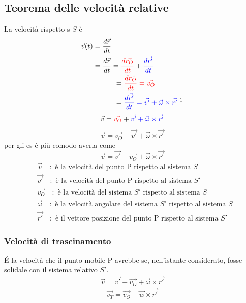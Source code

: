 \documentclass[twoside]{article}
\begin{document}
\subsection{Teorema delle velocità relative}
La velocità rispetto s $S$ è
\begin{align*}
  \vec{v}(t) & =  \frac{d \vec{r}}{dt}                                                                                                        \\
             & =  \frac{d \vec{r}}{dt} = \textcolor{red}{\frac{d \vec{r_O}}{dt}} + \textcolor{blue}{\frac{d \vec{r'}}{dt}}                    \\
             & \quad \quad \quad = \textcolor{red}{\frac{d \vec{r_O}}{dt} = \vec{v_O}}                                                        \\
             & \quad \quad \quad = \textcolor{blue}{\frac{d \vec{r'}}{dt} = \vec{v'} + \vec{\omega} \times \vec{r'}}\ \text{\footnotemark[1]}
\end{align*}
\begin{equation*}
  \vec{v} =  \textcolor{red}{\vec{v_O}} + \textcolor{blue}{\vec{v'} + \vec{\omega} \times \vec{r'}}
\end{equation*}
\begin{equation}
  \boxed{\vec{v} =  \vec{v_O} + \vec{v'} + \vec{\omega} \times \vec{r'}}
\end{equation}
per gli es è più comodo averla come
\begin{equation}
  \boxed{\vec{v} = \vec{v'} + \vec{v_O} + \vec{\omega} \times \vec{r'}}
\end{equation}
\begin{align*}
   & \vec{v}      \quad : \text{ è la velocità del punto P rispetto al sistema } S                      \\
   & \vec{v'}     \quad : \text{ è la velocità del punto P rispetto al sistema } S'                     \\
   & \vec{v_O}    \quad : \text{ è la velocità del sistema } S' \text{ rispetto al sistema } S          \\
   & \vec{\omega} \quad : \text{ è la velocità angolare del sistema } S' \text{ rispetto al sistema } S \\
   & \vec{r'}     \quad : \text{ è il vettore posizione del punto P rispetto al sistema } S'
\end{align*}
\subsubsection{Velocità di trascinamento}
\'E la velocità che il punto mobile P avrebbe se, nell'istante considerato, fosse solidale con il sistema relativo $S'$.
\begin{equation*}
  \vec{v} = \vec{v'} + \underline{\vec{v_O} + \vec{\omega} \times \vec{r'}}
\end{equation*}
\begin{equation}
  \boxed{\vec{v_T} = \vec{v_O} + \vec{w} \times \vec{r'}}
\end{equation}
\newpage
\end{document}
